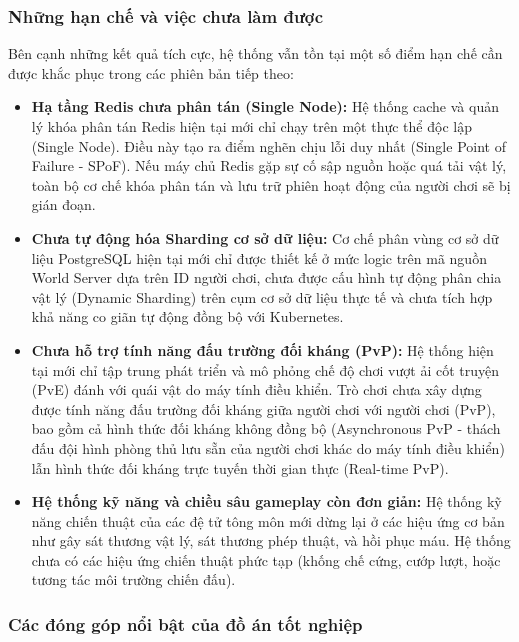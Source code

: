 \documentclass[../Project.tex]{subfiles}
\begin{document}
\subsubsection{Những hạn chế và việc chưa làm được}

Bên cạnh những kết quả tích cực, hệ thống vẫn tồn tại một số điểm hạn chế cần được khắc phục trong các phiên bản tiếp theo:
\begin{itemize}
    \item \textbf{Hạ tầng Redis chưa phân tán (Single Node):} Hệ thống cache và quản lý khóa phân tán Redis hiện tại mới chỉ chạy trên một thực thể độc lập (Single Node). Điều này tạo ra điểm nghẽn chịu lỗi duy nhất (Single Point of Failure - SPoF). Nếu máy chủ Redis gặp sự cố sập nguồn hoặc quá tải vật lý, toàn bộ cơ chế khóa phân tán và lưu trữ phiên hoạt động của người chơi sẽ bị gián đoạn.
    \item \textbf{Chưa tự động hóa Sharding cơ sở dữ liệu:} Cơ chế phân vùng cơ sở dữ liệu PostgreSQL hiện tại mới chỉ được thiết kế ở mức logic trên mã nguồn World Server dựa trên ID người chơi, chưa được cấu hình tự động phân chia vật lý (Dynamic Sharding) trên cụm cơ sở dữ liệu thực tế và chưa tích hợp khả năng co giãn tự động đồng bộ với Kubernetes.
    \item \textbf{Chưa hỗ trợ tính năng đấu trường đối kháng (PvP):} Hệ thống hiện tại mới chỉ tập trung phát triển và mô phỏng chế độ chơi vượt ải cốt truyện (PvE) đánh với quái vật do máy tính điều khiển. Trò chơi chưa xây dựng được tính năng đấu trường đối kháng giữa người chơi với người chơi (PvP), bao gồm cả hình thức đối kháng không đồng bộ (Asynchronous PvP - thách đấu đội hình phòng thủ lưu sẵn của người chơi khác do máy tính điều khiển) lẫn hình thức đối kháng trực tuyến thời gian thực (Real-time PvP).
    \item \textbf{Hệ thống kỹ năng và chiều sâu gameplay còn đơn giản:} Hệ thống kỹ năng chiến thuật của các đệ tử tông môn mới dừng lại ở các hiệu ứng cơ bản như gây sát thương vật lý, sát thương phép thuật, và hồi phục máu. Hệ thống chưa có các hiệu ứng chiến thuật phức tạp (khống chế cứng, cướp lượt, hoặc tương tác môi trường chiến đấu).
\end{itemize}

\subsubsection{Các đóng góp nổi bật của đồ án tốt nghiệp}
\end{document}
